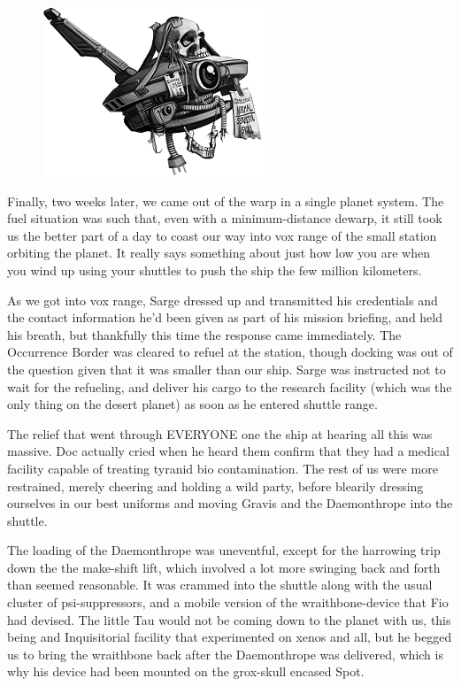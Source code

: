\begin{figure}
	\begin{center}
		\includegraphics[width=\figwidth]{pics/15/74.png}
	\end{center}
\end{figure}
Finally, two weeks later, we came out of the warp in a single planet system. 
The fuel situation was such that, even with a minimum-distance dewarp, it still took us the better part of a day to coast our way into vox range of the small station orbiting the planet. 
It really says something about just how low you are when you wind up using your shuttles to push the ship the few million kilometers.

As we got into vox range, Sarge dressed up and transmitted his credentials and the contact information he'd been given as part of his mission briefing, and held his breath, but thankfully this time the response came immediately. 
The Occurrence Border was cleared to refuel at the station, though docking was out of the question given that it was smaller than our ship. 
Sarge was instructed not to wait for the refueling, and deliver his cargo to the research facility (which was the only thing on the desert planet) as soon as he entered shuttle range. 


The relief that went through EVERYONE one the ship at hearing all this was massive. 
Doc actually cried when he heard them confirm that they had a medical facility capable of treating tyranid bio contamination. 
The rest of us were more restrained, merely cheering and holding a wild party, before blearily dressing ourselves in our best uniforms and moving Gravis and the Daemonthrope into the shuttle.

The loading of the Daemonthrope was uneventful, except for the harrowing trip down the the make-shift lift, which involved a lot more swinging back and forth than seemed reasonable. 
It was crammed into the shuttle along with the usual cluster of psi-suppressors, and a mobile version of the wraithbone-device that Fio had devised. 
The little Tau would not be coming down to the planet with us, this being and Inquisitorial facility that experimented on xenos and all, but he begged us to bring the wraithbone back after the Daemonthrope was delivered, which is why his device had been mounted on the grox-skull encased Spot.

